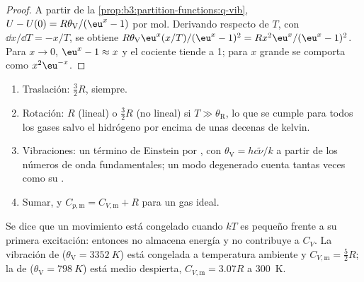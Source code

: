 \begin{proof}
A partir de la \cref{prop:b3:partition-functions:q-vib}, $U - U(0) = R\theta_{\mathrm V}/(\eu^x - 1)$ por mol.
Derivando respecto de $T$, con $\dd x/\dd T = -x/T$, se obtiene
$R\theta_{\mathrm V}\eu^x(x/T)/(\eu^x - 1)^2 = Rx^2\eu^x/(\eu^x - 1)^2$. Para $x \to 0$, $\eu^x - 1 \approx x$ y el
cociente tiende a 1; para $x$ grande se comporta como $x^2\eu^{-x}$.
\end{proof}

\begin{method}\label{met:b3:statistical-thermo-applied:cv}
\begin{enumerate}
  \item Traslación: $\frac32R$, siempre.
  \item Rotación: $R$ (lineal) o $\frac32R$ (no lineal) si $T \gg \theta_{\mathrm R}$, lo que se cumple para todos los
        gases salvo el hidrógeno por encima de unas decenas de kelvin.
  \item Vibraciones: un término de Einstein por , con $\theta_{\mathrm V} = hc\tilde\nu/k$ a partir de
        los números de onda fundamentales; un modo degenerado cuenta tantas veces como
        su .
  \item Sumar, y $C_{p,\mathrm m} = C_{V,\mathrm m} + R$ para un gas ideal.
\end{enumerate}
\end{method}

Se dice que un movimiento está congelado cuando $kT$ es pequeño frente a su primera
excitación: entonces no almacena energía y no contribuye a $C_V$. La
vibración de  ($\theta_{\mathrm V} = \qty{3352}{K}$) está congelada a temperatura ambiente y
$C_{V,\mathrm m} = \frac52R$; la de  ($\theta_{\mathrm V} = \qty{798}{K}$) está medio despierta,
$C_{V,\mathrm m} = 3.07R$ a \qty{300}{K}.

